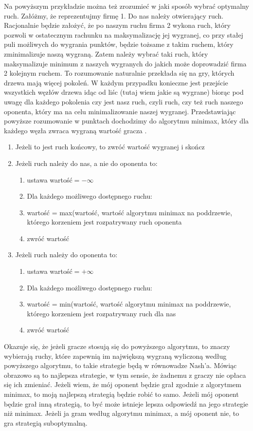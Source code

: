 \documentclass[licencjacka]{pracamgr}
\begin{document}
Na powyższym przykładzie można też zrozumieć w jaki sposób wybrać optymalny ruch. Załóżmy, że reprezentujmy firmę 1. Do nas należy otwierający ruch. Racjonalnie będzie założyć, że po naszym ruchu firma 2 wykona ruch, który pozwoli w ostatecznym rachunku na maksymalizację jej wygranej, co przy stałej puli możliwych do wygrania punktów, będzie tożsame z takim ruchem, który zminimalizuje naszą wygraną. Zatem należy wybrać taki ruch, który maksymalizuje minimum z naszych wygranych do jakich może doprowadzić firma 2 kolejnym ruchem.  To rozumowanie naturalnie przekłada się na gry, których drzewa mają więcej pokoleń. W każdym przypadku konieczne jest przejście wszystkich węzłów drzewa idąc od liśc (tutaj wiem jakie są wygrane) biorąc pod uwagę dla każdego pokolenia czy jest nasz ruch, czyli ruch, czy też ruch naszego oponenta, który ma na celu minimalizowanie naszej wygranej. Przedstawiając powyższe rozumowanie w punktach dochodzimy do algorytmu minimax, który dla każdego węzła zwraca wygraną wartość gracza . \\

\begin{enumerate}
	\item{Jeżeli to jest ruch końcowy, to zwróć wartość wygranej i skończ}
	\item{Jeżeli ruch należy do nas, a nie do oponenta to:}
	\begin{enumerate}
		\item{ustawa wartość$=-\infty$}
		\item{Dla każdego możliwego dostępnego ruchu: }
		\item{wartość = max(wartość,  wartość algorytmu minimax na poddrzewie, którego korzeniem jest rozpatrywany ruch oponenta}
		\item{zwróć wartość}
	\end{enumerate}
		\item{Jeżeli ruch należy do oponenta to:}
	\begin{enumerate}
		\item{ustawa wartość$=+\infty$}
		\item{Dla każdego możliwego dostępnego ruchu: }
		\item{wartość = min(wartość,  wartość algorytmu minimax na poddrzewie, którego korzeniem jest rozpatrywany ruch dla nas}
		\item{zwróć wartość}
	\end{enumerate}
\end{enumerate}


Okazuje się, że jeżeli gracze stosują się do powyższego algorytmu, to znaczy wybierają ruchy, które zapewnią im największą wygraną wyliczoną według powyższego algorytmu, to takie strategie będą w równowadze Nash'a. Mówiąc obrazowo są  to najlepsza strategie, w tym sensie, że żadnemu z graczy nie opłaca się ich zmieniać. Jeżeli wiem, że mój oponent będzie grał zgodnie z algorytmem minimax, to moją najlepszą strategią będzie robić to samo. Jeżeli mój oponent będzie grał inną strategią, to być może istnieje lepsza odpowiedź na jego strategie niż minimax.  Jeżeli ja gram według algorytmu minimax, a mój oponent nie, to gra strategią suboptymalną. 
\end{document}
